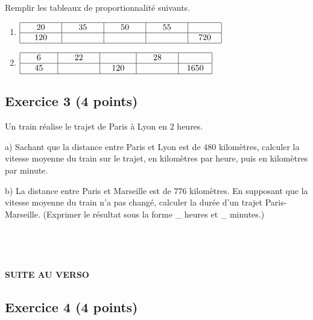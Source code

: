 \documentclass[14 pt]{extarticle}
\theoremstyle{plain}
\begin{document}
Remplir les tableaux de proportionnalité suivants. 

\begin{enumerate}
\item $\renewcommand{\arraystretch}{1}
\begin{array}{|c|c|c|c|c|}
\hline
\phantom{000}20 \phantom{000} & \phantom{000}35\phantom{000} & \phantom{000}50 \phantom{000}&  \phantom{000}55\phantom{000} & \phantom{000} \phantom{000} \\
\hline
120 & \phantom{700} &   & & 720 \\
\hline
\end{array}
\renewcommand{\arraystretch}{1}$

\item $\renewcommand{\arraystretch}{1}
\begin{array}{|c|c|c|c|c|}
\hline
\phantom{000}6\phantom{000} & \phantom{000}22\phantom{000} & \phantom{000} \ \phantom{000} & \phantom{000}28\phantom{000}& \phantom{000}\phantom{000}   \\
\hline
45 &   & 120& &1650\\
\hline
\end{array}
\renewcommand{\arraystretch}{1}$
\end{enumerate}

\subsection*{Exercice 3 (4 points)}

Un train réalise le trajet de Paris à Lyon en $2$ heures. 

a) Sachant que la distance entre Paris et Lyon est de $480$ 
kilomètres, calculer la vitesse moyenne du train sur le trajet, en kilomètres par heure, puis en kilomètres par minute. 

b) La distance entre Paris et Marseille est de $776$ kilomètres. En 
supposant que la vitesse moyenne du train n'a pas changé, calculer la durée d'un trajet Paris-Marseille. (Exprimer le résultat sous la forme \_ heures et \_ minutes.)

\ 

\

{\Large{\begin{center} \textbf{SUITE AU VERSO} \end{center}}}
\newpage


\subsection*{Exercice 4 (4 points)}
\end{document}
